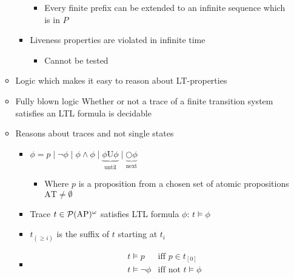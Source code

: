 \begin{itemize}
\begin{itemize}
\begin{itemize}
                        \begin{itemize}
                            \item Every finite prefix can be extended to an infinite sequence which is in $P$
                        \end{itemize}
                    \item Liveness properties are violated in infinite time
                        \begin{itemize}
                            \item Cannot be tested
                        \end{itemize}
                \end{itemize}
        \end{itemize}
        \begin{itemize}
            \item Logic which makes it easy to reason about LT-properties
            \item Fully blown logic
            \ipro Whether or not a trace of a finite transition system satisfies an LTL formula is decidable
            \item Reasons about traces and not single states
                \begin{itemize}
                    \item $\phi = p \mid \neg \phi \mid \phi \wedge \phi \mid \underbrace{\phi \text{U} \phi}_{\text{until}} \mid \underbrace{\bigcirc \phi}_{\text{next}}$
                        \begin{itemize}
                            \item Where $p$ is a proposition from a chosen set of atomic propositions $\text{AT} \neq \emptyset$
                        \end{itemize}
                \end{itemize}
                \begin{itemize}
                    \item Trace $t \in \mathcal{P}(\text{AP})^\omega$ satisfies LTL formula $\phi$: $t \models \phi$
                    \item $t_{(\ge i)}$ is the suffix of $t$ starting at $t_i$
                    \item
\begin{align*}
    &t \models p &\text{iff }  p \in t_{[0]}\\
    &t \models \neg \phi &\text{iff not } t \models \phi\\

\end{align*}
\end{itemize}
\end{itemize}
\end{itemize}

